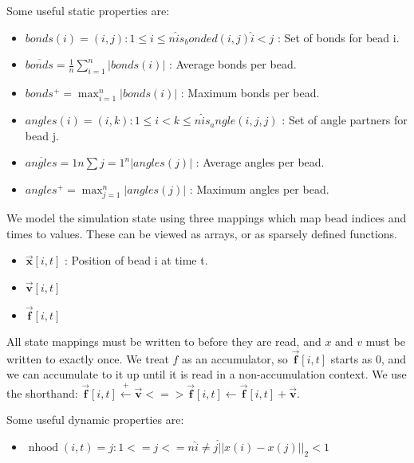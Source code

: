 \documentclass{article}
\newcommand{\leftarrowplus}{\xleftarrow{+}}
\newcommand{\VEC}[1]{\vec{\mathbf #1}}
\newcommand{\IND}[3]{\vec{\mathbf #1}\left[#2,#3\right]}
\begin{document}
Some useful static properties are:
\begin{itemize}
\item $bonds(i) = { (i,j) : 1 \leq i \leq n \hat is_bonded(i,j) \hat i < j }$ : Set of bonds for bead i.
\item $\overline{bonds} =  \frac{1}{n} \sum_{i=1}^n |bonds(i)|$ : Average bonds per bead. 
\item $bonds^+ =  \max_{i=1}^n |bonds(i)|$ : Maximum bonds per bead. 
\item $angles(i) = { (i,k) : 1 \leq i < k \leq n \hat is_angle(i,j,j) }$ : Set of angle partners for bead j.
\item $\overline{angles} = {1}{n} \sum{j=1}^n |angles(j)|$ : Average angles per bead.
\item $angles^+ = \max_{j=1}^n |angles(j)|$ : Maximum angles per bead.
\end{itemize}


We model the simulation state using three mappings which map bead indices
and times to values. These can be viewed as arrays, or as sparsely defined
functions.
\begin{itemize}
\item $\IND{x}{i}{t}$ : Position of bead i at time t.
\item $\IND{v}{i}{t}$
\item $\IND{f}{i}{t}$
\end{itemize}
All state mappings must be written to before they are read, and
$x$ and $v$ must be written to exactly once.
We treat $f$ as an accumulator, so $\IND{f}{i}{t}$ starts as
0, and we can accumulate to it up until it is read in a 
non-accumulation context. We use the shorthand:
$ \IND{f}{i}{t} \leftarrowplus \VEC{v} <=> \IND{f}{i}{t} \leftarrow \IND{f}{i}{t} + \VEC{v}$.

Some useful dynamic properties are:
\begin{itemize}
\item $\operatorname{nhood}(i,t) = { j : 1<=j<=n \hat i \neq j \hat ||x(i)-x(j)||_2 < 1}$
\end{itemize}
\end{document}
